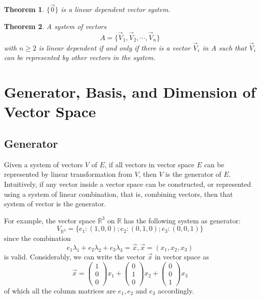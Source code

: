 \documentclass{book}
\newtheorem{Theorem}{Theorem}[section]
\numberwithin{identity}{subsection}
\numberwithin{Rule}{subsection}
\numberwithin{Theorem}{subsection}
\numberwithin{Definition}{subsection}
\begin{document}
\begin{Theorem}
    $\{\vec{0}\}$ is a linear dependent vector system.
\end{Theorem}

\begin{Theorem}
    A system of vectors $$A=\{\vec{V}_{1}, \vec{V}_{2},\cdots ,\vec{V}_{n} \}$$ with $n \geq 2$ is linear dependent if and only if there is a vector $\vec{V}_{i}$ in $A$ such that $\vec{V}_{i}$ can be represented by other vectors in the system.
\end{Theorem}

\section{Generator, Basis, and Dimension of Vector Space}

\subsection{Generator}

Given a system of vectors $V$ of $E$, if all vectors in vector space $E$ can be represented by linear transformation from $V$, then $V$ is the generator of $E$. Intuitively, if any vector inside a vector space can be constructed, or represented using a system of linear combination, that is, combining vectors, then that system of vector is the generator. 

For example, the vector space $\mathbb{R}^{3}$ on $\mathbb{R}$ has the following system as generator: $$V_{\mathbb{R}^{3}}=\{e_{1}: (1,0,0); e_{2}: (0,1,0);e_{3}:(0,0,1)\}$$ since the combination $$e_{1}\lambda_{1}+e_{2}\lambda_{2}+e_{3}\lambda_{3} = \vec{x}, \vec{x}=(x_{1},x_{2},x_{3})$$ is valid. Considerably, we can write the vector $\vec{x}$ in vector space as $$\vec{x}=\begin{pmatrix}
1 \\
0 \\
0
\end{pmatrix}x_{1}+\begin{pmatrix}
0 \\
1 \\
0
\end{pmatrix}x_{2}+\begin{pmatrix}
0 \\
0 \\
1
\end{pmatrix}x_{3}$$ of which all the column matrices are $e_{1},e_{2}$ and $e_{3}$ accordingly. 
\end{document}
